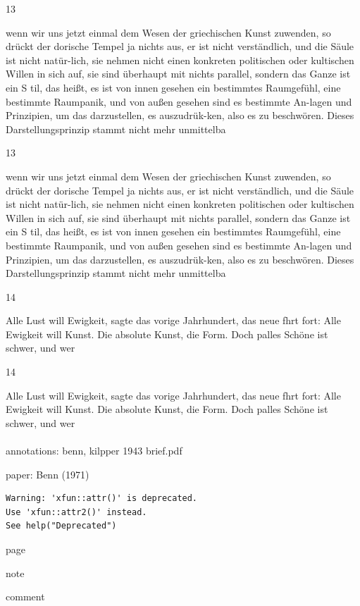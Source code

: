 \documentclass[
  letterpaper,
  DIV=11,
  numbers=noendperiod]{scrartcl}
\makeatletter
\let\oldparagraph\paragraph
\renewcommand{\paragraph}{
    \@ifstar
      \xxxParagraphStar
      \xxxParagraphNoStar
  }
\newcommand{\xxxParagraphStar}[1]{\oldparagraph*{#1}\mbox{}}
\newcommand{\xxxParagraphNoStar}[1]{\oldparagraph{#1}\mbox{}}
\makeatother
\begin{document}
13

wenn wir uns jetzt einmal dem Wesen der griechischen Kunst zuwenden, so
drückt der dorische Tempel ja nichts aus, er ist nicht verständlich, und
die Säule ist nicht natür-lich, sie nehmen nicht einen konkreten
politischen oder kultischen Willen in sich auf, sie sind überhaupt mit
nichts parallel, sondern das Ganze ist ein S til, das heißt, es ist von
innen gesehen ein bestimmtes Raumgefühl, eine bestimmte Raumpanik, und
von außen gesehen sind es bestimmte An-lagen und Prinzipien, um das
darzustellen, es auszudrük-ken, also es zu beschwören. Dieses
Darstellungsprinzip stammt nicht mehr unmittelba

13

wenn wir uns jetzt einmal dem Wesen der griechischen Kunst zuwenden, so
drückt der dorische Tempel ja nichts aus, er ist nicht verständlich, und
die Säule ist nicht natür-lich, sie nehmen nicht einen konkreten
politischen oder kultischen Willen in sich auf, sie sind überhaupt mit
nichts parallel, sondern das Ganze ist ein S til, das heißt, es ist von
innen gesehen ein bestimmtes Raumgefühl, eine bestimmte Raumpanik, und
von außen gesehen sind es bestimmte An-lagen und Prinzipien, um das
darzustellen, es auszudrük-ken, also es zu beschwören. Dieses
Darstellungsprinzip stammt nicht mehr unmittelba

14

Alle Lust will Ewigkeit, sagte das vorige Jahrhundert, das neue fhrt
fort: Alle Ewigkeit will Kunst. Die absolute Kunst, die Form. Doch
palles Schöne ist schwer, und wer

14

Alle Lust will Ewigkeit, sagte das vorige Jahrhundert, das neue fhrt
fort: Alle Ewigkeit will Kunst. Die absolute Kunst, die Form. Doch
palles Schöne ist schwer, und wer

\paragraph{annotations: benn, kilpper 1943
brief.pdf}\label{annotations-benn-kilpper-1943-brief.pdf}

paper: Benn (1971)

\begin{verbatim}
Warning: 'xfun::attr()' is deprecated.
Use 'xfun::attr2()' instead.
See help("Deprecated")
\end{verbatim}

page

note

comment
\end{document}
